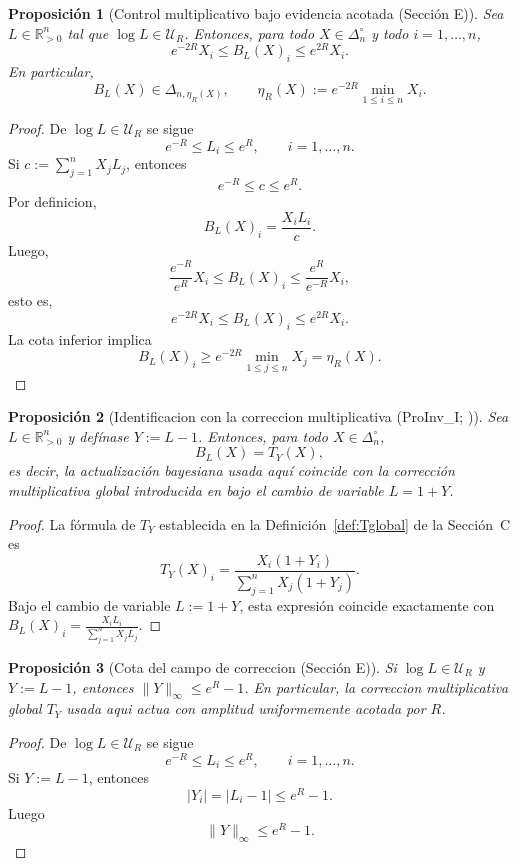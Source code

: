 ﻿\documentclass[12pt]{article}
\newcommand{\fuente}[1]{\textnormal{(#1)}}
\newcommand{\fuentecite}[2]{\textnormal{(#1; \citealp{#2})}}
\newtheorem{proposicion}{Proposición}[section]
\begin{document}
\begin{proposicion}[Control multiplicativo bajo evidencia acotada \fuente{Sección E}]
Sea \(L\in\mathbb R_{>0}^n\) tal que \(\log L\in\mathcal U_R\). Entonces, para todo \(X\in\Delta_n^\circ\) y todo \(i=1,\dots,n\),
\[
e^{-2R}X_i\le B_L(X)_i\le e^{2R}X_i.
\]
En particular,
\[
B_L(X)\in \Delta_{n,\eta_R(X)},
\qquad
\eta_R(X):=e^{-2R}\min_{1\le i\le n}X_i.
\]
\end{proposicion}
\begin{proof}
De \(\log L\in\mathcal U_R\) se sigue
\[
e^{-R}\le L_i\le e^R,\qquad i=1,\dots,n.
\]
Si \(c:=\sum_{j=1}^n X_jL_j\), entonces
\[
e^{-R}\le c\le e^R.
\]
Por definicion,
\[
B_L(X)_i=\frac{X_iL_i}{c}.
\]
Luego,
\[
\frac{e^{-R}}{e^R}X_i\le B_L(X)_i\le \frac{e^R}{e^{-R}}X_i,
\]
esto es,
\[
e^{-2R}X_i\le B_L(X)_i\le e^{2R}X_i.
\]
La cota inferior implica
\[
B_L(X)_i\ge e^{-2R}\min_{1\le j\le n}X_j=\eta_R(X).
\]
\end{proof}

\begin{proposicion}[Identificacion con la correccion multiplicativa \fuentecite{ProInv\_I}{ControlInformacional2026}]
Sea \(L\in\mathbb R_{>0}^n\) y defínase \(Y:=L-1\). Entonces, para todo \(X\in\Delta_n^\circ\),
\[
B_L(X)=T_Y(X),
\]
es decir, la actualización bayesiana usada aquí coincide con la corrección multiplicativa global introducida en \cite{ControlInformacional2026} bajo el cambio de variable \(L=1+Y\).
\end{proposicion}
\begin{proof}
La fórmula de \(T_Y\) establecida en la Definición~\ref{def:Tglobal} de la Sección~C es
\[
T_Y(X)_i=\frac{X_i(1+Y_i)}{\sum_{j=1}^n X_j(1+Y_j)}.
\]
Bajo el cambio de variable \(L := 1+Y\), esta expresión coincide exactamente con \(B_L(X)_i = \frac{X_iL_i}{\sum_{j=1}^n X_jL_j}\).
\end{proof}

\begin{proposicion}[Cota del campo de correccion \fuente{Sección E}]
Si \(\log L\in\mathcal U_R\) y \(Y:=L-1\), entonces \(\|Y\|_\infty\le e^R-1\). En particular, la correccion multiplicativa global \(T_Y\) usada aqui actua con amplitud uniformemente acotada por \(R\).
\end{proposicion}
\begin{proof}
De \(\log L\in\mathcal U_R\) se sigue
\[
e^{-R}\le L_i\le e^R,
\qquad i=1,\dots,n.
\]
Si \(Y:=L-1\), entonces
\[
|Y_i|=|L_i-1|\le e^R-1.
\]
Luego
\[
\|Y\|_\infty\le e^R-1.
\]
\end{proof}
\end{document}
